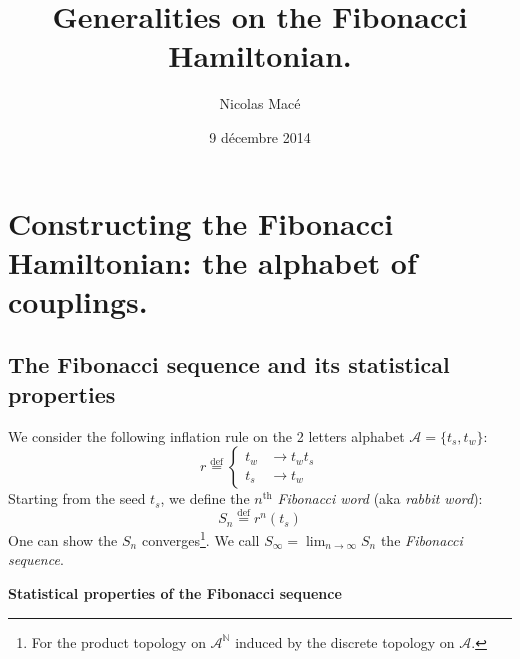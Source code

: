 \documentclass[11pt]{article}
\title{\textbf{Generalities on the Fibonacci Hamiltonian.}}
\author{Nicolas Macé}
\date{9 décembre 2014}
\newcommand{\define}{\ensuremath{ \overset{\text{def}}{=} }}
\begin{document}

\maketitle

\section{Constructing the Fibonacci Hamiltonian: the alphabet of couplings.}

\subsection{The Fibonacci sequence and its statistical properties}

We consider the following inflation rule on the 2 letters alphabet $\mathcal{A} = \{t_s, t_w \}$:
\begin{equation}
	r \define \begin{cases}
        t_{w} & \rightarrow t_w t_s \\
        t_s & \rightarrow t_w
      \end{cases}
\end{equation} 
Starting from the seed $t_s$, we define the $n^\text{th}$ \emph{Fibonacci word} (aka \emph{rabbit word}):
\begin{equation}
	S_n \define r^{n}(t_s)
\end{equation}
One can show the $S_n$ converges\footnote{For the product topology on $\mathcal{A}^\mathds{N}$ induced by the discrete topology on $\mathcal{A}$.}. We call $S_\infty = \lim_{n \rightarrow \infty} S_n$ the \emph{Fibonacci sequence}.

\textbf{Statistical properties of the Fibonacci sequence}
\end{document}
